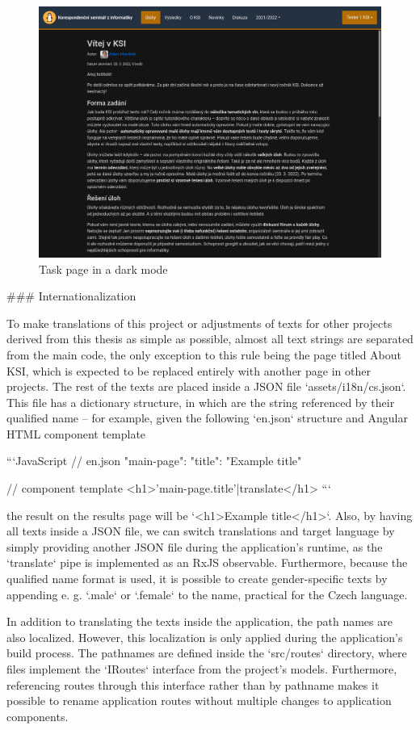 \documentclass[
  digital, %
  oneside, %
  lof,     %
  nolot,     %
]{fithesis4}
\begin{document}
{\begin{figure}
\includegraphics[width=.8\textwidth]{assets/img/dark-mode}
\caption{Task page in a dark mode}
\label{fig:dark-mode}
\end{figure}

### Internationalization
\label{chap:translations}

To make translations of this project or adjustments of texts for other projects derived from this thesis as simple as possible, almost all text strings are separated from the main code, the only exception to this rule being the page titled About KSI, which is expected to be replaced entirely with another page in other projects. The rest of the texts are placed inside a JSON file `assets/i18n/cs.json`. This file has a dictionary structure, in which are the string referenced by their qualified name -- for example, given the following `en.json` structure and Angular HTML component template

```JavaScript
// en.json
{
	"main-page": {
		"title": "Example title"
	}
}

// component template
<h1>{{'main-page.title'|translate}}</h1>
```

the result on the results page will be `<h1>Example title</h1>`. Also, by having all texts inside a JSON file, we can switch translations and target language by simply providing another JSON file during the application's runtime, as the `translate` pipe is implemented as an RxJS observable. Furthermore, because the qualified name format is used, it is possible to create gender-specific texts by appending e. g. `.male` or `.female` to the name, practical for the Czech language.

In addition to translating the texts inside the application, the path names are also localized. However, this localization is only applied during the application's build process. The pathnames are defined inside the `src/routes` directory, where files implement the `IRoutes` interface from the project's models. Furthermore, referencing routes through this interface rather than by pathname makes it possible to rename application routes without multiple changes to application components.

}
\end{document}
